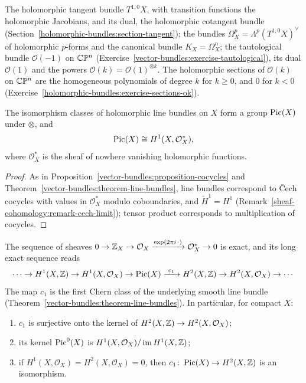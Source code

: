 \begin{example}\label{holomorphic-bundles:example-bundles}
The holomorphic tangent bundle $T^{1,0}X$, with transition functions the holomorphic Jacobians, and its dual, the holomorphic cotangent bundle
(Section~\ref{holomorphic-bundles:section-tangent}); the bundles $\Omega^p_X = \Lambda^p(T^{1,0}X)^\vee$ of holomorphic $p$-forms and the canonical bundle
$K_X = \Omega^n_X$; the tautological bundle $\mathcal{O}(-1)$ on $\mathbb{C}\mathbb{P}^n$ (Exercise~\ref{vector-bundles:exercise-tautological}), its dual $\mathcal{O}(1)$ and the powers
$\mathcal{O}(k) = \mathcal{O}(1)^{\otimes k}$. The holomorphic sections of $\mathcal{O}(k)$ on $\mathbb{C}\mathbb{P}^n$ are the homogeneous polynomials of degree $k$ for $k \geq 0$, and $0$ for $k < 0$
(Exercise~\ref{holomorphic-bundles:exercise-sections-ok}).
\end{example}

\begin{proposition}\label{holomorphic-bundles:proposition-picard}
The isomorphism classes of holomorphic line bundles on $X$ form a group $\operatorname{Pic}(X)$ under $\otimes$, and
\[
\operatorname{Pic}(X) \cong H^1(X, \mathcal{O}_X^*),
\]
where $\mathcal{O}_X^*$ is the sheaf of nowhere vanishing holomorphic functions.
\end{proposition}

\begin{proof}
As in Proposition~\ref{vector-bundles:proposition-cocycles} and Theorem~\ref{vector-bundles:theorem-line-bundles}, line bundles correspond to \v{C}ech cocycles with values in $\mathcal{O}_X^*$ modulo
coboundaries, and $\check{H}^1 = H^1$ (Remark~\ref{sheaf-cohomology:remark-cech-limit}); tensor product corresponds to multiplication of cocycles.
\end{proof}

\begin{theorem}\label{holomorphic-bundles:theorem-exponential}
The sequence of sheaves $0 \to \mathbb{Z}_X \to \mathcal{O}_X \xrightarrow{\exp(2\pi i\,\cdot)} \mathcal{O}_X^* \to 0$ is exact, and its long exact sequence reads
\[
\cdots \to H^1(X, \mathbb{Z}) \to H^1(X, \mathcal{O}_X) \to \operatorname{Pic}(X) \xrightarrow{\ c_1\ } H^2(X, \mathbb{Z}) \to H^2(X, \mathcal{O}_X) \to \cdots
\]
The map $c_1$ is the first Chern class of the underlying smooth line bundle (Theorem~\ref{vector-bundles:theorem-line-bundles}). In particular, for compact $X$:
\begin{enumerate}
\item $c_1$ is surjective onto the kernel of $H^2(X, \mathbb{Z}) \to H^2(X, \mathcal{O}_X)$;
\item its kernel $\operatorname{Pic}^0(X)$ is $H^1(X, \mathcal{O}_X)/\operatorname{im}H^1(X, \mathbb{Z})$;
\item if $H^1(X, \mathcal{O}_X) = H^2(X, \mathcal{O}_X) = 0$, then $c_1 \colon \operatorname{Pic}(X) \to H^2(X, \mathbb{Z})$ is an isomorphism.
\end{enumerate}
\end{theorem}

